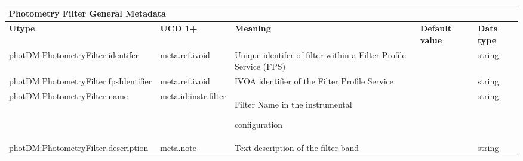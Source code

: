\documentclass[11pt,a4paper]{ivoa}
\begin{document}
\begin{appendices}
\newpage
\begin{table}[H]
\centering
\begin{adjustbox}{angle=90}
\begin{tabular}{p{2.5in}|p{1.5in}|p{2in}|p{0.74in}|p{0.35in}}
\multicolumn{5}{p{\dimexpr6.59in+8\tabcolsep\relax}}{\centering 
{\fontsize{8pt}{8pt}\selectfont \textbf{Photometry Filter General Metadata}}} \\
\hline
\multicolumn{1}{p{2.5in}}{{\fontsize{8pt}{8pt}\selectfont \textbf{Utype}}} &
\multicolumn{1}{p{1.5in}}{{\fontsize{8pt}{8pt}\selectfont \textbf{UCD 1+}}} &
\multicolumn{1}{p{2in}}{{\fontsize{8pt}{8pt}\selectfont \textbf{Meaning}}} &
\multicolumn{1}{p{0.74in}}{{\fontsize{8pt}{8pt}\selectfont \textbf{Default value}}} &
\multicolumn{1}{p{0.35in}}{{\fontsize{8pt}{8pt}\selectfont \textbf{Data type}}} \\
\hline
\multicolumn{1}{p{2.5in}}{{\fontsize{8pt}{8pt}\selectfont photDM:PhotometryFilter.identifer}} &
\multicolumn{1}{p{1.5in}}{{\fontsize{8pt}{8pt}\selectfont meta.ref.ivoid }} &
\multicolumn{1}{p{2in}}{{\fontsize{8pt}{8pt}\selectfont Unique identifer of 
filter within a Filter Profile Service (FPS)}} &
\multicolumn{1}{p{0.74in}}{} &
\multicolumn{1}{p{0.35in}}{{\fontsize{8pt}{8pt}\selectfont string}} \\
\hline
\multicolumn{1}{p{2.5in}}{{\fontsize{8pt}{8pt}\selectfont photDM:PhotometryFilter.fpsIdentifier}} &
\multicolumn{1}{p{1.5in}}{{\fontsize{8pt}{8pt}\selectfont meta.ref.ivoid }} &
\multicolumn{1}{p{2in}}{{\fontsize{8pt}{8pt}\selectfont IVOA identifier of the 
Filter Profile Service}} &
\multicolumn{1}{p{0.74in}}{} &
\multicolumn{1}{p{0.35in}}{{\fontsize{8pt}{8pt}\selectfont string}} \\
\hline
\multicolumn{1}{p{2.5in}}{{\fontsize{8pt}{8pt}\selectfont photDM:PhotometryFilter.name}} &
\multicolumn{1}{p{1.5in}}{{\fontsize{8pt}{8pt}\selectfont meta.id;instr.filter }} &
\multicolumn{1}{p{2in}}{{\fontsize{8pt}{8pt}\selectfont Filter Name in the instrumental } 
\par {\fontsize{10pt}{12.0pt}\selectfont configuration\  }} &
\multicolumn{1}{p{0.74in}}{} &
\multicolumn{1}{p{0.35in}}{{\fontsize{8pt}{8pt}\selectfont string}} \\
\hline
\multicolumn{1}{p{2.5in}}{{\fontsize{8pt}{8pt}\selectfont photDM:PhotometryFilter.description}} &
\multicolumn{1}{p{1.5in}}{{\fontsize{8pt}{8pt}\selectfont meta.note }} &
\multicolumn{1}{p{2in}}{{\fontsize{8pt}{8pt}\selectfont Text description of the filter band}} &
\multicolumn{1}{p{0.74in}}{} &
\multicolumn{1}{p{0.35in}}{{\fontsize{8pt}{8pt}\selectfont string}} \\
\hline
\end{tabular}
\end{adjustbox}
 \end{table}



\end{appendices}
\end{document}
